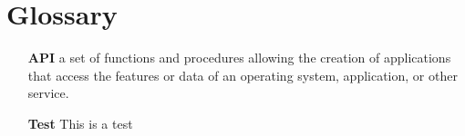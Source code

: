 \section*{Glossary}

\begin{itemize}
    \item[\textbf{API}]{a set of functions and procedures allowing the creation of applications that access the features or data of an operating system, application, or other service.}
    \item[\textbf{Test}]{This is a test}
\end{itemize}

\newpage 